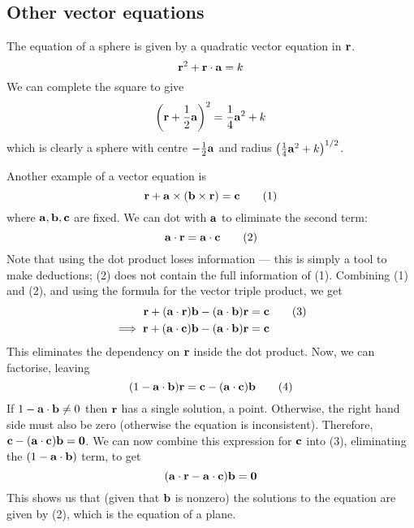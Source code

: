 \subsection{Other vector equations}
The equation of a sphere is given by a quadratic vector equation in \(\vb r\).
\[
	\vb r^2 + \vb r \cdot \vb a = k
\]
We can complete the square to give
\[
	\left(\vb r + \frac 1 2 \vb a \right)^2 = \frac 1 4 \vb a^2 + k
\]
which is clearly a sphere with centre \(-\frac 1 2 \vb a\) and radius \(\left( \frac 1 4 \vb a^2 + k \right)^{1/2}\).

Another example of a vector equation is
\[
	\vb r + \vb a \times (\vb b \times \vb r) = \vb c \tag{1}
\]
where \(\vb a, \vb b, \vb c\) are fixed.
We can dot with \(\vb a\) to eliminate the second term:
\[
	\vb a \cdot \vb r = \vb a \cdot \vb c \tag{2}
\]
Note that using the dot product loses information --- this is simply a tool to make deductions; (2) does not contain the full information of (1).
Combining (1) and (2), and using the formula for the vector triple product, we get
\begin{align*}
	\vb r + (\vb a \cdot \vb r) \vb b - (\vb a \cdot \vb b) \vb r          & = \vb c \tag{3} \\
	\implies \vb r + (\vb a \cdot \vb c) \vb b - (\vb a \cdot \vb b) \vb r & = \vb c
\end{align*}
This eliminates the dependency on \(\vb r\) inside the dot product.
Now, we can factorise, leaving
\[
	(1 - \vb a \cdot \vb b) \vb r = \vb c - (\vb a \cdot \vb c) \vb b \tag{4}
\]
If \(1 - \vb a \cdot \vb b \neq 0\) then \(\vb r\) has a single solution, a point.
Otherwise, the right hand side must also be zero (otherwise the equation is inconsistent).
Therefore, \(\vb c - (\vb a \cdot \vb c)\vb b = \vb 0\).
We can now combine this expression for \(\vb c\) into (3), eliminating the \((1- \vb a \cdot \vb b)\) term, to get
\[
	(\vb a \cdot \vb r - \vb a \cdot \vb c) \vb b = \vb 0
\]
This shows us that (given that \(\vb b\) is nonzero) the solutions to the equation are given by (2), which is the equation of a plane.
